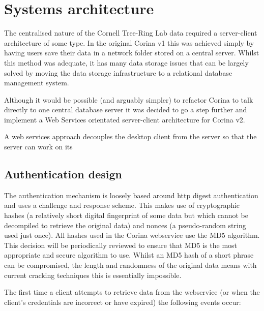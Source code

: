 
\chapter{Systems architecture}
The centralised nature of the Cornell Tree-Ring Lab data required a server-client architecture of some type. In the original Corina v1 this was achieved simply by having users save their data in a network folder stored on a central server. Whilst this method was adequate, it has many data storage issues that can be largely solved by moving the data storage infrastructure to a relational database management system.  

Although it would be possible (and arguably simpler) to refactor Corina to talk directly to one central database server it was decided to go a step further and implement a Web Services orientated server-client architecture for Corina v2.  

A web services approach decouples the desktop client from the server so that the server can work on its 

\section{Authentication design}
\label{txt:authentication}
The authentication mechanism is loosely based around http digest authentication and uses a challenge and response scheme. This makes use of cryptographic hashes (a relatively short digital fingerprint of some data but which cannot be decompiled to retrieve the original data) and nonces (a pseudo-random string used just once). All hashes used in the Corina webservice use the MD5 algorithm. This decision will be periodically reviewed to ensure that MD5 is the most appropriate and secure algorithm to use. Whilst an MD5 hash of a short phrase can be compromised, the length and randomness of the original data means with current cracking techniques this is essentially impossible.

The first time a client attempts to retrieve data from the webservice (or when the client's credentials are incorrect or have expired) the following events occur:


